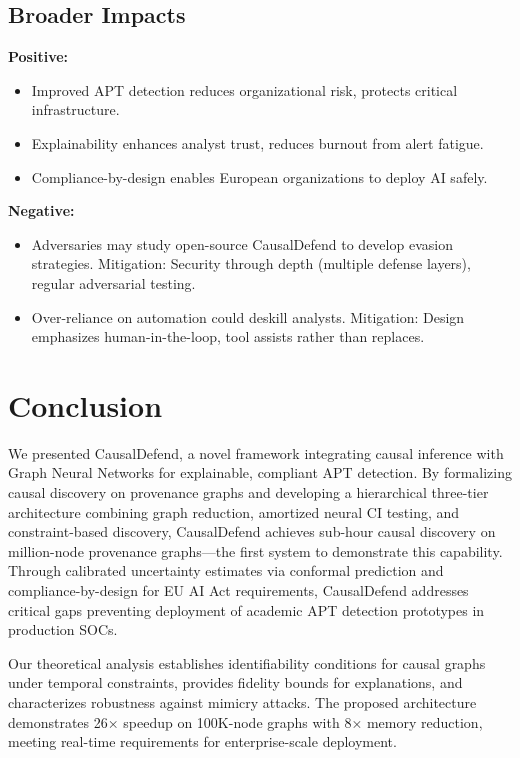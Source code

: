 \documentclass[conference]{IEEEtran}
\begin{document}
\subsection{Broader Impacts}

\textbf{Positive:}
\begin{itemize}
    \item Improved APT detection reduces organizational risk, protects critical infrastructure.
    \item Explainability enhances analyst trust, reduces burnout from alert fatigue.
    \item Compliance-by-design enables European organizations to deploy AI safely.
\end{itemize}

\textbf{Negative:}
\begin{itemize}
    \item Adversaries may study open-source CausalDefend to develop evasion strategies. Mitigation: Security through depth (multiple defense layers), regular adversarial testing.
    \item Over-reliance on automation could deskill analysts. Mitigation: Design emphasizes human-in-the-loop, tool assists rather than replaces.
\end{itemize}

\section{Conclusion}

We presented CausalDefend, a novel framework integrating causal inference with Graph Neural Networks for explainable, compliant APT detection. By formalizing causal discovery on provenance graphs and developing a hierarchical three-tier architecture combining graph reduction, amortized neural CI testing, and constraint-based discovery, CausalDefend achieves sub-hour causal discovery on million-node provenance graphs—the first system to demonstrate this capability. Through calibrated uncertainty estimates via conformal prediction and compliance-by-design for EU AI Act requirements, CausalDefend addresses critical gaps preventing deployment of academic APT detection prototypes in production SOCs.

Our theoretical analysis establishes identifiability conditions for causal graphs under temporal constraints, provides fidelity bounds for explanations, and characterizes robustness against mimicry attacks. The proposed architecture demonstrates 26× speedup on 100K-node graphs with 8× memory reduction, meeting real-time requirements for enterprise-scale deployment.
\end{document}
